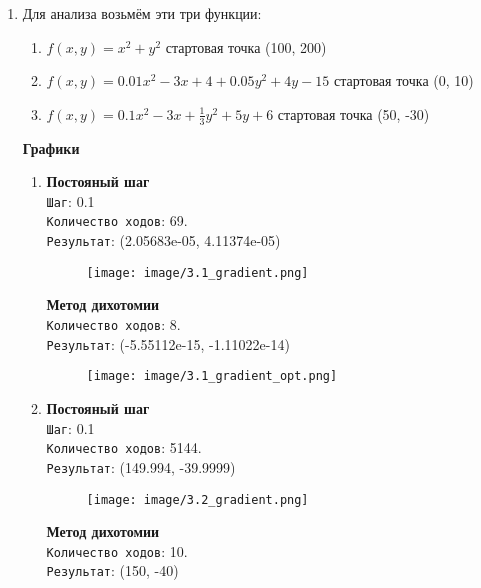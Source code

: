 \documentclass[12pt, a4paper]{article}
\begin{document}
\begin{enumerate}
    \item 
Для анализа возьмём эти три функции:
\begin{enumerate}
    \item $f(x, y) = x^2 + y^2$ стартовая точка (100, 200)
    \item $f(x, y) = 0.01x^2 - 3x + 4 + 0.05y^2 + 4y - 15$ стартовая точка (0, 10)
    \item $f(x, y) = 0.1x^2 - 3x + \frac{1}{3}y^2 + 5y + 6$ стартовая точка (50, -30)
\end{enumerate}

\newpage

\textbf{Графики}

\begin{enumerate}
    \item 

\textbf{Постояный шаг}\\
\texttt{Шаг}: 0.1\\
\texttt{Количество ходов}: 69.\\
\texttt{Результат}: (2.05683e-05, 4.11374e-05)

\begin{figure}[h]
\centering
\texttt{[image: image/3.1\_gradient.png]}
\end{figure}

\textbf{Метод дихотомии}\\
\texttt{Количество ходов}: 8.\\
\texttt{Результат}: (-5.55112e-15, -1.11022e-14)

\begin{figure}[h]
\centering
\texttt{[image: image/3.1\_gradient\_opt.png]}
\end{figure}

    \item 

\textbf{Постояный шаг}\\
\texttt{Шаг}: 0.1\\
\texttt{Количество ходов}: 5144.\\
\texttt{Результат}: (149.994, -39.9999)

\begin{figure}[h]
\centering
\texttt{[image: image/3.2\_gradient.png]}
\end{figure}

\textbf{Метод дихотомии}\\
\texttt{Количество ходов}: 10.\\
\texttt{Результат}: (150, -40)


\end{enumerate}
\end{enumerate}
\end{document}
